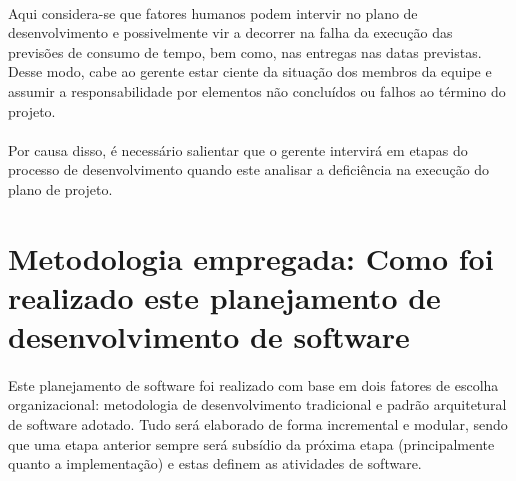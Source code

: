 \documentclass[12pt,a4paper]{article}
\begin{document}
		\paragraph{} Aqui considera-se que fatores humanos podem intervir no plano de desenvolvimento e possivelmente vir a decorrer na falha da execução das previsões de consumo de tempo, bem como, nas entregas nas datas previstas. Desse modo, cabe ao gerente estar ciente da situação dos membros da equipe e assumir a responsabilidade por elementos não concluídos ou falhos ao término do projeto. 
		\paragraph{} Por causa disso, é necessário salientar que o gerente intervirá em etapas do processo de desenvolvimento quando este analisar a deficiência na execução do plano de projeto.
		\section{Metodologia empregada: Como foi realizado este planejamento de desenvolvimento de software}
		\paragraph{}Este planejamento de software foi realizado com base em dois fatores de escolha organizacional: metodologia de desenvolvimento tradicional  e padrão arquitetural de software adotado. Tudo será elaborado de forma incremental e modular, sendo que uma etapa anterior sempre será subsídio da próxima etapa (principalmente quanto a implementação) e estas definem as atividades de software.
		
\end{document}
